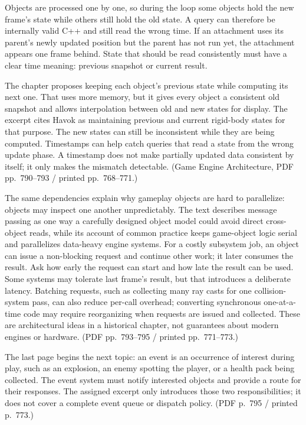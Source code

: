 \hypertarget{05-engine-i-ch014-make-mixed-time-reads-visible}{}

Objects are processed one by one, so during the loop some objects hold the new frame's state while others still hold the old state. A query can therefore be internally valid C++ and still read the wrong time. If an attachment uses its parent's newly updated position but the parent has not run yet, the attachment appears one frame behind. State that should be read consistently must have a clear time meaning: previous snapshot or current result.

The chapter proposes keeping each object's previous state while computing its next one. That uses more memory, but it gives every object a consistent old snapshot and allows interpolation between old and new states for display. The excerpt cites Havok as maintaining previous and current rigid-body states for that purpose. The new states can still be inconsistent while they are being computed. Timestamps can help catch queries that read a state from the wrong update phase. A timestamp does not make partially updated data consistent by itself; it only makes the mismatch detectable. (Game Engine Architecture, PDF pp.~790--793 / printed pp.~768--771.)

The same dependencies explain why gameplay objects are hard to parallelize: objects may inspect one another unpredictably. The text describes message passing as one way a carefully designed object model could avoid direct cross-object reads, while its account of common practice keeps game-object logic serial and parallelizes data-heavy engine systems. For a costly subsystem job, an object can issue a non-blocking request and continue other work; it later consumes the result. Ask how early the request can start and how late the result can be used. Some systems may tolerate last frame's result, but that introduces a deliberate latency. Batching requests, such as collecting many ray casts for one collision-system pass, can also reduce per-call overhead; converting synchronous one-at-a-time code may require reorganizing when requests are issued and collected. These are architectural ideas in a historical chapter, not guarantees about modern engines or hardware. (PDF pp.~793--795 / printed pp.~771--773.)

The last page begins the next topic: an event is an occurrence of interest during play, such as an explosion, an enemy spotting the player, or a health pack being collected. The event system must notify interested objects and provide a route for their responses. The assigned excerpt only introduces those two responsibilities; it does not cover a complete event queue or dispatch policy. (PDF p.~795 / printed p.~773.)

